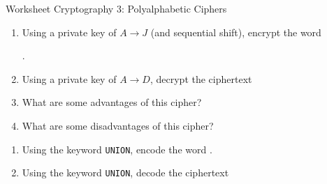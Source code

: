 \documentclass[12pt]{article}
\newcommand{\be}{\begin{enumerate}}
\newcommand{\ee}{\end{enumerate}}
\begin{document}
\begin{center}
{\Large  Worksheet Cryptography 3: Polyalphabetic Ciphers}
\end{center}


\item {} 



\be
\item Using a private key of $A \to J$ (and sequential shift), encrypt the word 

.
\vfill

\item Using a private key of $A \to D$, decrypt the ciphertext 


\vfill

\item What are some advantages of this cipher?

\vfill

\item What are some disadvantages of this cipher?

\vfill
\ee
\newpage

\item {} 

\be
\item Using the keyword {\tt UNION}, encode the word .

\vfill

\item Using the keyword {\tt UNION}, decode the ciphertext   
\vfill




\end{enumerate}
\end{document}
